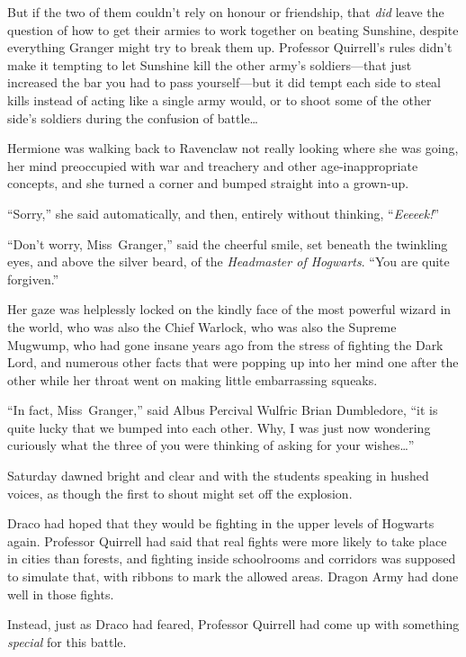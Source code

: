 But if the two of them couldn’t rely on honour or friendship, that \emph{did} leave the question of how to get their armies to work together on beating Sunshine, despite everything Granger might try to break them up. Professor Quirrell’s rules didn’t make it tempting to let Sunshine kill the other army’s soldiers—that just increased the bar you had to pass yourself—but it did tempt each side to steal kills instead of acting like a single army would, or to shoot some of the other side’s soldiers during the confusion of battle…

\later

Hermione was walking back to Ravenclaw not really looking where she was going, her mind preoccupied with war and treachery and other age-inappropriate concepts, and she turned a corner and bumped straight into a grown-up.

“Sorry,” she said automatically, and then, entirely without thinking, “\emph{Eeeeek!}”

“Don’t worry, Miss~Granger,” said the cheerful smile, set beneath the twinkling eyes, and above the silver beard, of the \emph{Headmaster of Hogwarts}.
“You are quite forgiven.”

Her gaze was helplessly locked on the kindly face of the most powerful wizard in the world, who was also the Chief Warlock, who was also the Supreme Mugwump, who had gone insane years ago from the stress of fighting the Dark Lord, and numerous other facts that were popping up into her mind one after the other while her throat went on making little embarrassing squeaks.

“In fact, Miss~Granger,” said Albus Percival Wulfric Brian Dumbledore, “it is quite lucky that we bumped into each other. Why, I was just now wondering curiously what the three of you were thinking of asking for your wishes…”

\later

Saturday dawned bright and clear and with the students speaking in hushed voices, as though the first to shout might set off the explosion.

\later

Draco had hoped that they would be fighting in the upper levels of Hogwarts again. Professor Quirrell had said that real fights were more likely to take place in cities than forests, and fighting inside schoolrooms and corridors was supposed to simulate that, with ribbons to mark the allowed areas. Dragon Army had done well in those fights.

Instead, just as Draco had feared, Professor Quirrell had come up with something \emph{special} for this battle.

